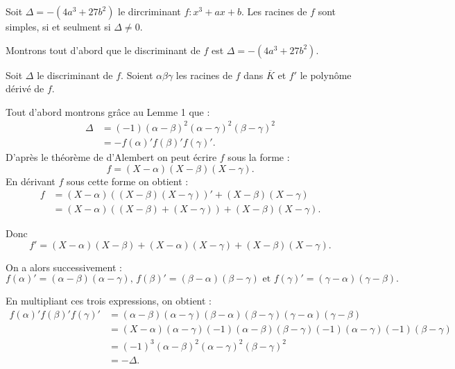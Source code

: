 
\newpage
\begin{lemme}
    Soit $\Delta= -(4a^3 + 27b^2)$ le dircriminant $f : x^3 + ax + b$. 
    Les racines de $f$ sont simples, si et seulment si $\Delta \neq 0$.
\end{lemme}

\begin{demonstration}
    Montrons tout d'abord que le discriminant de $f$ est $\Delta= -(4a^3 + 27b^2)$.

    Soit $\Delta$ le discriminant de $f$. Soient $\alpha \beta \gamma $ les racines de $f$ dans $\overline{K}$ et $f'$ le polynôme dérivé de $f$.

    Tout d'abord montrons grâce au Lemme 1 que :
    \begin{align*}
        \Delta &= (-1) ( \alpha - \beta )^2 ( \alpha - \gamma )^2 ( \beta - \gamma )^2 \\
          &= - f(\alpha)'f(\beta )'f(\gamma)'
    .\end{align*}
    D'après le théorème de d'Alembert on peut écrire $f$ sous la forme :
    \[
        f = \left( X - \alpha \right) \left( X - \beta \right) \left( X - \gamma \right) 
    .\] 
    En dérivant $f$ sous cette forme on obtient :
    \begin{align*}
        f &= ( X - \alpha ) \left( ( X - \beta ) ( X - \gamma ) \right)'  + ( X - \beta ) ( X - \gamma )\\
          &= ( X - \alpha ) \left( ( X - \beta ) + ( X - \gamma ) \right) + ( X - \beta ) ( X - \gamma ) 
    .\end{align*}

    Donc  
\[
f' = ( X - \alpha ) ( X - \beta ) + ( X - \alpha ) ( X - \gamma ) + ( X - \beta ) ( X - \gamma )
.\] 

On a alors successivement : 
\[
    f(\alpha)' = ( \alpha - \beta) ( \alpha - \gamma ) \text{, } f(\beta )' = ( \beta - \alpha) ( \beta - \gamma) \text{ et } f(\gamma)' = ( \gamma - \alpha) ( \gamma - \beta)
.\] 

En multipliant ces trois expressions, on obtient :
\begin{align*}
    f(\alpha)' f(\beta )' f(\gamma)' &= ( \alpha - \beta ) ( \alpha - \gamma ) ( \beta - \alpha ) ( \beta - \gamma) ( \gamma - \alpha ) ( \gamma - \beta ) \\
&= \left( X - \alpha \right) \left( \alpha - \gamma \right) \left( -1 \right) \left( \alpha - \beta  \right) \left( \beta - \gamma \right) \left( -1 \right) \left( \alpha - \gamma \right) \left( -1 \right) \left( \beta - \gamma \right) \\
&= \left( -1 \right) ^3 \left( \alpha - \beta  \right) ^2 \left( \alpha - \gamma  \right) ^2 \left( \beta - \gamma \right) ^2\\
 &= - \Delta
.\end{align*}


\end{demonstration}
